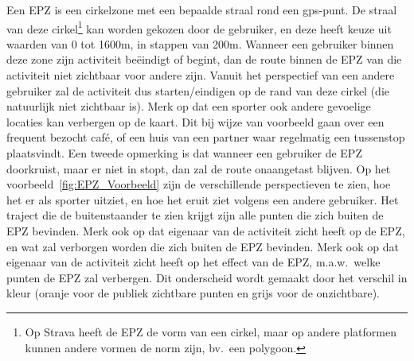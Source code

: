Een EPZ is een cirkelzone met een bepaalde straal rond een gps-punt. De straal
van deze cirkel\footnote{Op Strava heeft de EPZ de vorm van een cirkel, maar op
    andere platformen kunnen andere vormen de norm zijn, bv.\ een polygoon.} kan
worden gekozen door de gebruiker, en deze heeft keuze uit waarden van 0 tot
1600m, in stappen van 200m. Wanneer een gebruiker binnen deze zone zijn
activiteit beëindigt of begint, dan de route binnen de EPZ van die activiteit
niet zichtbaar voor andere zijn. Vanuit het perspectief van een andere
gebruiker zal de activiteit dus starten/eindigen op de rand van deze cirkel
(die natuurlijk niet zichtbaar is). Merk op dat een sporter ook andere
gevoelige locaties kan verbergen op de kaart. Dit bij wijze van voorbeeld gaan
over een frequent bezocht café, of een huis van een partner waar regelmatig een
tussenstop plaatsvindt. Een tweede opmerking is dat wanneer een gebruiker de
EPZ doorkruist, maar er niet in stopt, dan zal de route onaangetast blijven. Op
het voorbeeld~\ref{fig:EPZ_Voorbeeld} zijn de verschillende perspectieven te
zien, hoe het er als sporter uitziet, en hoe het eruit ziet volgens een andere
gebruiker. Het traject die de buitenstaander te zien krijgt zijn alle punten
die zich buiten de EPZ bevinden. Merk ook op dat eigenaar van de activiteit
zicht heeft op de EPZ, en wat zal verborgen worden die zich buiten de EPZ
bevinden. Merk ook op dat eigenaar van de activiteit zicht heeft op het effect
van de EPZ, m.a.w.\ welke punten de EPZ zal verbergen. Dit onderscheid wordt
gemaakt door het verschil in kleur (oranje voor de publiek zichtbare punten en
grijs voor de onzichtbare).
